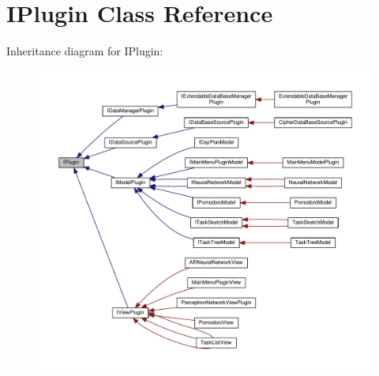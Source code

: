 \hypertarget{class_i_plugin}{}\section{I\+Plugin Class Reference}
\label{class_i_plugin}


Inheritance diagram for I\+Plugin\+:\nopagebreak
\begin{figure}[H]
\begin{center}
\leavevmode
\includegraphics[width=350pt]{class_i_plugin__inherit__graph}
\end{center}
\end{figure}
